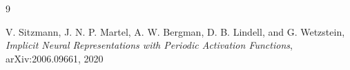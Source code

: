 \documentclass[a4paper,11pt,oneside]{book}
\begin{document}
    
    \newpage
    \thispagestyle{empty}
    \tableofcontents

    \mainmatter
    
    
    



    

    
    
    
    \begin{thebibliography}{9}
    	
    	V. Sitzmann, J. N. P. Martel, A. W. Bergman, D. B. Lindell, and G. Wetzstein,
    	\textit{Implicit Neural Representations with Periodic Activation Functions},
    	arXiv:2006.09661, 2020
    	
    \end{thebibliography}
    
    
%        
%        
    
\end{document}
